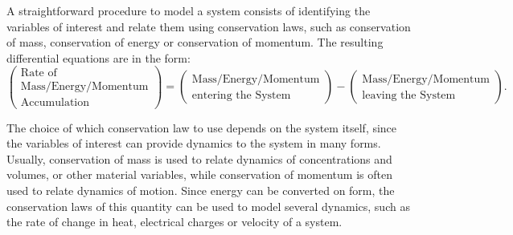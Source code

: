 \documentclass[a4paper,11pt]{book}
\numberwithin{figure}{chapter}
\numberwithin{equation}{chapter}
\numberwithin{table}{chapter}
\theoremstyle{definition}
\begin{document}
A straightforward procedure to model a system consists of identifying the variables of interest and relate them using conservation laws, such as conservation of mass, conservation of energy or conservation of momentum. The resulting differential equations are in the form:
\begin{equation} \label{eq:massCons01}
    \begin{pmatrix}
        \text{Rate of} \\ \text{Mass/Energy/Momentum} \\ \text{Accumulation}
    \end{pmatrix} = \begin{pmatrix}
        \text{Mass/Energy/Momentum} \\ \text{entering the System}
    \end{pmatrix} - \begin{pmatrix}
        \text{Mass/Energy/Momentum} \\ \text{leaving the System}
    \end{pmatrix}
.\end{equation}

The choice of which conservation law to use depends on the system itself, since the variables of interest can provide dynamics to the system in many forms. Usually, conservation of mass is used to relate dynamics of concentrations and volumes, or other material variables, while conservation of momentum is often used to relate dynamics of motion. Since energy can be converted on form, the conservation laws of this quantity can be used to model several dynamics, such as the rate of change in heat, electrical charges or velocity of a system.
\end{document}
